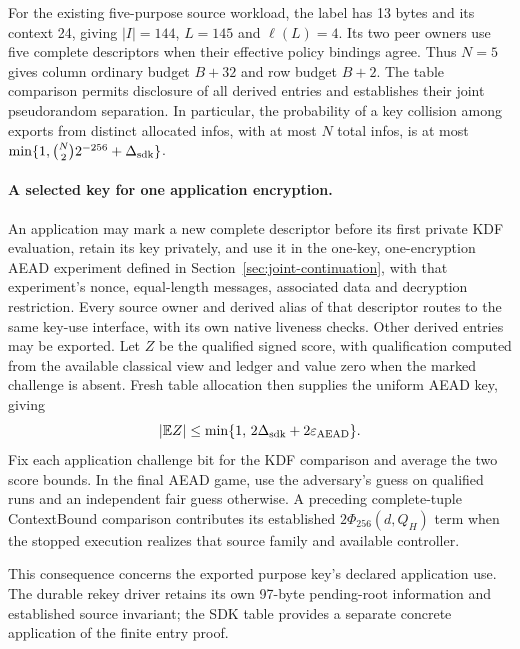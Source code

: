 For the existing five-purpose source workload, the label has 13 bytes and
its context 24, giving $|I|=144$, $L=145$ and $\ell(L)=4$. Its two peer
owners use five complete descriptors when their effective policy bindings
agree. Thus $N=5$ gives column ordinary budget $B+32$ and row budget $B+2$.
The table comparison permits disclosure of all derived entries and
establishes their joint pseudorandom separation. In particular, the
probability of a key collision among exports from distinct allocated infos,
with at most $N$ total infos, is at most $\min\{1,\binom N2 2^{-256}+\Delta_{\rm sdk}\}$.

\paragraph{A selected key for one application encryption.}
An application may mark a new complete descriptor before its first private
KDF evaluation, retain its key privately, and use it in the one-key,
one-encryption AEAD experiment defined in
Section~\ref{sec:joint-continuation}, with that experiment's nonce,
equal-length messages, associated data and decryption restriction. Every source owner and derived alias of that descriptor routes
to the same key-use interface, with its own native liveness checks. Other
derived entries may be exported. Let $Z$ be the qualified signed score,
with qualification computed from the available classical view and ledger
and value zero when the marked challenge is absent. Fresh table allocation
then supplies the uniform AEAD key, giving
\[
 |\mathbb E Z|\le\min\{1,\,2\Delta_{\rm sdk}
                                  +2\varepsilon_{\rm AEAD}\}.
\]
Fix each application challenge bit for the KDF comparison and average the
two score bounds. In the final AEAD game, use the adversary's guess on
qualified runs and an independent fair guess otherwise. A preceding
complete-tuple ContextBound comparison contributes its established
$2\Phi_{256}(d,Q_H)$ term when the stopped execution realizes that source
family and available controller.

This consequence concerns the exported purpose key's declared application
use. The durable rekey driver retains its own 97-byte pending-root
information and established source invariant; the SDK table provides a
separate concrete application of the finite entry proof.
